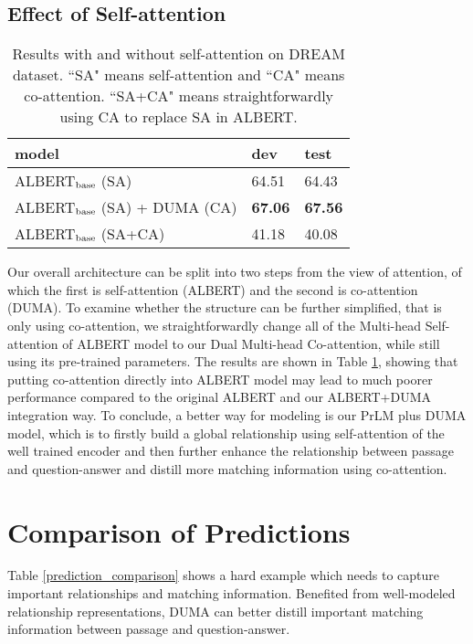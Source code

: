 \documentclass[letterpaper]{article} \usepackage{aaai21}  \usepackage{times}  \usepackage{helvet} \usepackage{courier}  \usepackage[hyphens]{url}  \usepackage{graphicx} \urlstyle{rm} \def\UrlFont{\rm}  \usepackage{natbib}  \usepackage{caption} \frenchspacing  \setlength{\pdfpagewidth}{8.5in}  \setlength{\pdfpageheight}{11in}
\begin{document}
\subsection{Effect of Self-attention}
\begin{table}[t]\small
\renewcommand\arraystretch{1.1}
	\centering
	{
		\begin{tabular}{l|l|l}
			\hline		
			 model & dev & test  \\
			\hline
			\hline
			ALBERT$_{\rm base}$ (SA) & 64.51 & 64.43 \\
			ALBERT$_{\rm base}$ (SA) + DUMA (CA) & \textbf{67.06} & \textbf{67.56} \\
			ALBERT$_{\rm base}$ (SA+CA) & 41.18  &  40.08 \\
			\hline
		\end{tabular}
		
	}
	\caption{\label{only_co_attention} Results with and without self-attention on DREAM dataset. ``SA" means self-attention and ``CA" means co-attention. ``SA+CA" means straightforwardly using CA to replace SA in ALBERT.}
\end{table}
Our overall architecture can be split into two steps from the view of attention, of which the first is self-attention (ALBERT) and the second is co-attention (DUMA). To examine whether the structure can be further simplified, that is only using co-attention, we straightforwardly change all of the Multi-head Self-attention of ALBERT model to our Dual Multi-head Co-attention, while still using its pre-trained parameters. The results are shown in Table \ref{only_co_attention}, showing that putting co-attention directly into ALBERT model may lead to much poorer performance compared to the original ALBERT and our ALBERT+DUMA integration way. To conclude, a better way for modeling is our PrLM plus DUMA model, which is to firstly build a global relationship using self-attention of the well trained encoder and then further enhance the relationship between passage and question-answer and distill more matching information using co-attention.
\section{Comparison of Predictions}

Table \ref{prediction_comparison} shows a hard example which needs to capture important relationships and matching information. Benefited from well-modeled relationship representations, DUMA can better distill important matching information between passage and question-answer.
\end{document}
